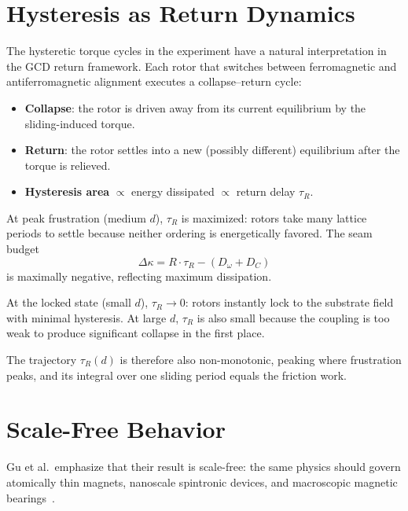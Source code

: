 \documentclass[
  aps,
  prd,
  twocolumn,
  superscriptaddress,
  nofootinbib,
  floatfix
]{revtex4-2}
\newcommand{\tR}{\tau_{\!R}}
\newcommand{\beq}{\begin{equation}}
\newcommand{\eeq}{\end{equation}}
\begin{document}
\section{Hysteresis as Return Dynamics}\label{sec:hysteresis}

The hysteretic torque cycles in the experiment have a
natural interpretation in the GCD return framework.
Each rotor that switches between ferromagnetic and
antiferromagnetic alignment executes a collapse--return
cycle:
\begin{itemize}[nosep]
  \item \textbf{Collapse}: the rotor is driven away
    from its current equilibrium by the sliding-induced
    torque.
  \item \textbf{Return}: the rotor settles into a new
    (possibly different) equilibrium after the torque
    is relieved.
  \item \textbf{Hysteresis area} $\propto$ energy
    dissipated $\propto$ return delay $\tR$.
\end{itemize}

At peak frustration (medium $d$), $\tR$ is maximized:
rotors take many lattice periods to settle because
neither ordering is energetically favored.  The seam
budget
\beq
  \Delta\kappa = R \cdot \tR - (D_\omega + D_C)
\eeq
is maximally negative, reflecting maximum dissipation.

At the locked state (small $d$), $\tR \to 0$: rotors
instantly lock to the substrate field with minimal
hysteresis.  At large $d$, $\tR$ is also small because
the coupling is too weak to produce significant
collapse in the first place.

The trajectory $\tR(d)$ is therefore also non-monotonic,
peaking where frustration peaks, and its integral over
one sliding period equals the friction work.

\section{Scale-Free Behavior}\label{sec:scalefree}

Gu et al.\ emphasize that their result is scale-free:
the same physics should govern atomically thin magnets,
nanoscale spintronic devices, and macroscopic magnetic
bearings~\cite{gu2026magnetic}.
\end{document}
